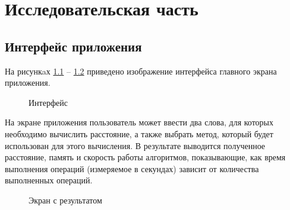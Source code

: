 \chapter{Исследовательская часть}

\section{Интерфейс приложения}

На рисункaх  \ref{fig:interface} -- \ref{fig:working} приведено изображение интерфейса главного экрана приложения.

\begin{figure}[h!]
	\caption{Интерфейс}
	\label{fig:interface}
\end{figure}


На экране приложения пользователь может ввести два слова, для которых необходимо вычислить расстояние, а также выбрать метод, который будет использован для этого вычисления. 
В результате выводится полученное расстояние, память и скорость работы алгоритмов, показывающие, как время выполнения операций (измеряемое в секундах) зависит от количества выполненных операций.

\begin{figure}[h!]
	\caption{Экран с результатом}
	\label{fig:working}
\end{figure}

